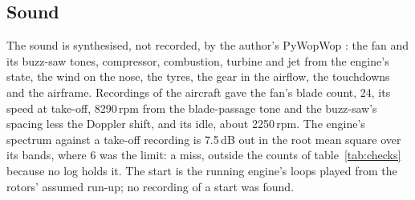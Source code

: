 \documentclass[10pt,a4paper,twocolumn]{article}
\begin{document}
\subsection{Sound}
The sound is synthesised, not recorded, by the author's PyWopWop \cite{pww}: the fan and its buzz-saw tones, compressor, combustion, turbine and
jet from the engine's state, the wind on the nose, the tyres, the gear in the airflow, the touchdowns and the airframe. Recordings of the aircraft gave
the fan's blade count, 24, its speed at take-off, 8290\,rpm from the blade-passage tone and the buzz-saw's spacing less the Doppler shift, and its
idle, about 2250\,rpm. The engine's spectrum against a take-off recording is 7.5\,dB out in the root mean square over its bands, where 6 was the
limit: a miss, outside the counts of table~\ref{tab:checks} because no log holds it. The start is the running engine's loops played from the rotors'
assumed run-up; no recording of a start was found.
\end{document}
